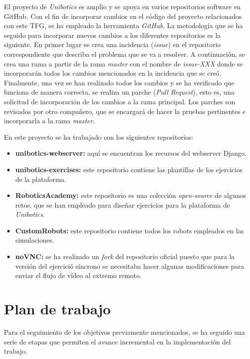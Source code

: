 \documentclass[a4paper, 12pt]{book}
\begin{document}
El proyecto de \emph{Unibotics} es amplio y se apoya en varios repositorios software en GitHub. Con el fin de incorporar cambios en el código del proyecto relacionados con este TFG, se ha empleado la herramienta \emph{GitHub}. La metodología que se ha seguido para incorporar nuevos cambios a los diferentes repositorios es la siguiente. En primer lugar se crea una incidencia (\emph{issue}) en el repositorio correspondiente que describa el problema que se va a resolver. A continuación, se crea una rama a partir de la rama \emph{master} con el nombre de \emph{issue-XXX} donde se incorporarán todos los cambios mencionados en la incidencia que se creó. Finalmente, una vez se han realizado todos los cambios y se ha verificado que funciona de manera correcta, se realiza un parche (\emph{Pull Request}), esto es, una solicitud de incorporación de los cambios a la rama principal. Los parches son revisados por otro compañero, que se encargará de hacer la pruebas pertinentes e incorporarla a la rama \emph{master}.

En este proyecto se ha trabajado con los siguientes repositorios:

\begin{itemize}
\item \textbf{unibotics-webserver:} aquí se encuentran los recursos del webserver Django.
\item \textbf{unibotics-exercises:} este repositorio contiene las plantillas de los ejercicios de la plataforma.
\item \textbf{RoboticsAcademy:} este repositorio es una colección \emph{open-source} de algunos retos, que se han empleado para diseñar ejercicios para la plataforma de \emph{Unibotics}.
\item \textbf{CustomRobots:} este repositorio contiene todos los robots empleados en las simulaciones.
\item \textbf{noVNC:} se ha realizado un \emph{fork} del repositorio oficial puesto que para la versión del ejercició síncrono se necesitaba hacer algunas modificaciones para enviar el flujo de vídeo al extremo remoto.
\end{itemize}

\section{Plan de trabajo}
\label{sec:plan-de-trabajo}

Para el seguimiento de los objetivos previamente mencionados, se ha seguido una serie de etapas que permiten el avance incremental en la implementación del trabajo.
\end{document}
